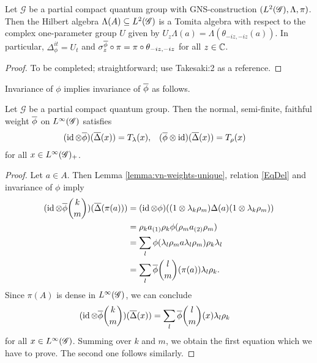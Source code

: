 \begin{Prop}
Let $\mathscr{G}$ be a partial compact quantum group with
GNS-construction $(L^{2}(\mathscr{G}),\Lambda,\pi)$. Then the Hilbert algebra $\Lambda(A) \subseteq
L^{2}(\mathscr{G})$ is a Tomita algebra with respect to the complex one-parameter
group $U$ given by $U_{z}\Lambda(a)=\Lambda(\theta_{-iz,-iz}(a))$. In
particular, $\Delta_{\phi}^{it}=U_{t}$ and $\sigma^{\overline{\phi}}_{z}\circ
\pi = \pi \circ \theta_{-iz,-iz}$ for all $z\in \mathbb{C}$.
\end{Prop}
\begin{proof}
  To be completed; straightforward; use Takesaki:2 as a reference.
\end{proof}
Invariance of $\phi$ implies invariance of $\overline{\phi}$ as follows.
\begin{Prop} \label{prop:vn-invariance}
  Let $\mathscr{G}$ be a partial compact quantum group. Then the
  normal, semi-finite, faithful weight $\overline{\phi}$ on $L^{\infty}(\mathscr{G})$ satisfies
  \begin{align*}
    (\operatorname{id} \otimes \overline{\phi})(\overline{\Delta}(x)) &=  T_{\lambda}(x), &
    (\overline{\phi} \otimes \operatorname{id})(\overline{\Delta}(x)) &= T_{\rho}(x)
  \end{align*}
for all $x\in L^{\infty}(\mathscr{G})_{+}$.
\end{Prop}
\begin{proof}
  Let  $a \in A$.  Then Lemma \ref{lemma:vn-weights-unique}, relation \eqref{EqDel}
  and invariance of $\phi$ imply
  \begin{align*}
    (\operatorname{id} \otimes \overline{\phi}{k\choose m})(\overline{\Delta}(\pi(a))) &= (\operatorname{id} \otimes
    \phi)((1 \otimes \lambda_{k}\rho_{m})\Delta(a)(1 \otimes
    \lambda_{k}\rho_{m})) \\ & =
    \rho_{k}a_{(1)}\rho_{k}\phi(\rho_{m}a_{(2)}\rho_{m}) \\ & = \sum_{l}
    \phi(\lambda_{l}\rho_{m}a\lambda_{l}\rho_{m})\rho_{k}\lambda_{l} \\
    & = \sum_{l} \overline{\phi}{l\choose m}(\pi(a)) \lambda_{l}\rho_{k}.
  \end{align*}
  Since $\pi(A)$ is dense in $L^{\infty}(\mathscr{G})$, we can conclude
  \begin{align*}
    (\operatorname{id} \otimes \overline{\phi}{k\choose m}) (\overline{\Delta} (x)) &= \sum_{l} \overline{\phi}{l\choose m}(x) \lambda_{l}\rho_{k}
  \end{align*}
  for all $x \in L^{\infty}(\mathscr{G})$. Summing over $k$ and $m$, we obtain the
  first  equation which we have to prove. The second one follows similarly.
\end{proof}


